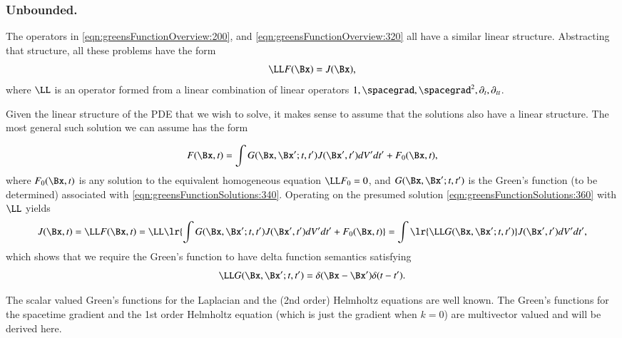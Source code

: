 %
%
\subsubsection{Unbounded.}

The operators in \cref{eqn:greensFunctionOverview:200}, and \cref{eqn:greensFunctionOverview:320} all have a similar linear structure.
Abstracting that structure, all these problems have the form
\begin{dmath}\label{eqn:greensFunctionSolutions:340}
\LL F(\Bx) = J(\Bx),
\end{dmath}
where \( \LL \) is an operator formed from a linear combination of linear operators \( 1, \spacegrad, \spacegrad^2, \partial_t, \partial_{tt} \).

Given the linear structure of the PDE that we wish to solve, it makes sense to assume that the solutions also have a linear structure.
The most general such solution we can assume has the form

\begin{dmath}\label{eqn:greensFunctionSolutions:360}
F(\Bx, t) = \int G(\Bx, \Bx' ; t, t') J(\Bx', t') dV' dt' + F_0(\Bx, t),
\end{dmath}
where \( F_0(\Bx, t) \) is any solution to the equivalent homogeneous equation \( \LL F_0 = 0 \), and \( G(\Bx, \Bx' ; t, t') \) is the Green's function (to be determined) associated with \cref{eqn:greensFunctionSolutions:340}.
Operating on the presumed solution
\cref{eqn:greensFunctionSolutions:360} with \( \LL \) yields
\begin{dmath}\label{eqn:greensFunctionSolutions:380}
J(\Bx, t) = \LL F(\Bx, t) = \LL\lr{
\int G(\Bx, \Bx' ; t, t') J(\Bx', t') dV' dt' + F_0(\Bx, t) }
=
\int \lr{ \LL G(\Bx, \Bx'; t, t') } J(\Bx', t') dV' dt',
\end{dmath}
which shows that we require the Green's function to have delta function semantics satisfying
\begin{dmath}\label{eqn:greensFunctionSolutions:400}
\LL G(\Bx, \Bx' ; t, t') = \delta(\Bx - \Bx') \delta(t - t').
\end{dmath}

The scalar valued Green's functions for the Laplacian and the (2nd order) Helmholtz equations are well known.
The Green's functions for the spacetime gradient and the 1st order Helmholtz equation (which is just the gradient when \( k = 0 \)) are multivector valued and will be derived here.

